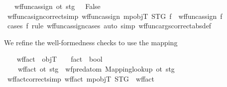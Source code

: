 \begin{isabellebody}
\ \ {\isacharbar}{\kern0pt}\ {\isachardoublequoteopen}wf{\isacharunderscore}{\kern0pt}func{\isacharunderscore}{\kern0pt}assign{\isacharprime}{\kern0pt}\ ot\ stg\ {\isacharunderscore}{\kern0pt}\ {\isasymlongleftrightarrow}\ False{\isachardoublequoteclose}\isanewline
\isanewline
\ \ \isamarkupfalse%
\ wf{\isacharunderscore}{\kern0pt}func{\isacharunderscore}{\kern0pt}asign{\isacharprime}{\kern0pt}{\isacharunderscore}{\kern0pt}correct{\isacharbrackleft}{\kern0pt}simp{\isacharbrackright}{\kern0pt}{\isacharcolon}{\kern0pt}\ {\isachardoublequoteopen}wf{\isacharunderscore}{\kern0pt}func{\isacharunderscore}{\kern0pt}assign{\isacharprime}{\kern0pt}\ mp{\isacharunderscore}{\kern0pt}objT\ STG\ f\ {\isacharequal}{\kern0pt}\ wf{\isacharunderscore}{\kern0pt}func{\isacharunderscore}{\kern0pt}assign\ f{\isachardoublequoteclose}\isanewline
%
\isadelimproof
\ \ \ \ %
\endisadelimproof
%
\isatagproof
{}\isamarkupfalse%
\ {\isacharparenleft}{\kern0pt}cases\ f\ rule{\isacharcolon}{\kern0pt}\ wf{\isacharunderscore}{\kern0pt}func{\isacharunderscore}{\kern0pt}assign{\isachardot}{\kern0pt}cases{\isacharparenright}{\kern0pt}\ {\isacharparenleft}{\kern0pt}auto\ simp{\isacharcolon}{\kern0pt}\ wf{\isacharunderscore}{\kern0pt}func{\isacharunderscore}{\kern0pt}args{\isacharprime}{\kern0pt}{\isacharunderscore}{\kern0pt}correct{\isacharbrackleft}{\kern0pt}abs{\isacharunderscore}{\kern0pt}def{\isacharbrackright}{\kern0pt}{\isacharparenright}{\kern0pt}%
\endisatagproof
{\isafoldproof}%
%
\isadelimproof
%
\endisadelimproof
%
\begin{isamarkuptext}%
We refine the well-formedness checks to use the mapping%
\end{isamarkuptext}\isamarkuptrue%
\ \ \isamarkupfalse%
\ wf{\isacharunderscore}{\kern0pt}fact{\isacharprime}{\kern0pt}\ {\isacharcolon}{\kern0pt}{\isacharcolon}{\kern0pt}\ {\isachardoublequoteopen}objT\ {\isasymRightarrow}\ {\isacharunderscore}{\kern0pt}\ {\isasymRightarrow}\ fact\ {\isasymRightarrow}\ bool{\isachardoublequoteclose}\ \isanewline
\ \ \ \ {\isachardoublequoteopen}wf{\isacharunderscore}{\kern0pt}fact{\isacharprime}{\kern0pt}\ ot\ stg\ {\isasymequiv}\ wf{\isacharunderscore}{\kern0pt}pred{\isacharunderscore}{\kern0pt}atom{\isacharprime}{\kern0pt}\ {\isacharparenleft}{\kern0pt}Mapping{\isachardot}{\kern0pt}lookup\ ot{\isacharparenright}{\kern0pt}\ stg{\isachardoublequoteclose}\isanewline
\isanewline
\ \ \isamarkupfalse%
\ wf{\isacharunderscore}{\kern0pt}fact{\isacharprime}{\kern0pt}{\isacharunderscore}{\kern0pt}correct{\isacharbrackleft}{\kern0pt}simp{\isacharbrackright}{\kern0pt}{\isacharcolon}{\kern0pt}\ {\isachardoublequoteopen}wf{\isacharunderscore}{\kern0pt}fact{\isacharprime}{\kern0pt}\ mp{\isacharunderscore}{\kern0pt}objT\ STG\ {\isacharequal}{\kern0pt}\ wf{\isacharunderscore}{\kern0pt}fact{\isachardoublequoteclose}\isanewline

\end{isabellebody}

